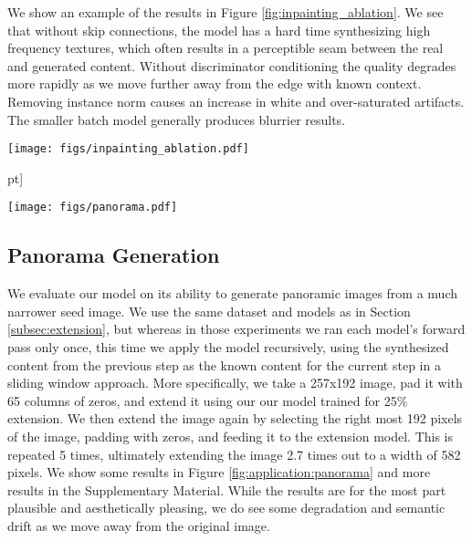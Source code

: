 We show an example of the results in Figure \ref{fig:inpainting_ablation}. We see that without skip connections, the model has a hard time synthesizing high frequency textures, which often results in a perceptible seam between the real and generated content. Without discriminator conditioning the quality degrades more rapidly as we move further away from the edge with known context. Removing instance norm causes an increase in white and over-saturated artifacts. The smaller batch model generally produces blurrier results.

\begin{figure*}
\newcommand{\figurewidth}{\textwidth}
\small
    \centering
    \begin{minipage}{\textwidth}
	    \centering
        \texttt{[image: figs/inpainting\_ablation.pdf]}
        \caption{Further analysis: (a) Comparing the different models on inpainting tasks; our conditioned model performs on par with the state of the art models such as PConv and DeepFill for the inpainting problem. (b) Ablation tests: we remove (from second column to fifth column) only one of the following: discriminator conditioning, instance norm, skip connections, and reduce batch size.}    
        \label{fig:inpainting_ablation}
    \end{minipage}\5pt]
 
    \begin{minipage}{\textwidth}
    	\centering
        \texttt{[image: figs/panorama.pdf]}
        \caption{Our models can also be used generate image panoramas. This can be viewed as a stress test for image extension tasks. We recursively apply the 25\% model to create a very large output image of about 3 times the original width.}
        \label{fig:application:panorama}
    \end{minipage}    
\end{figure*}

\subsection{Panorama Generation}
\label{subsec:panorama}

We evaluate our model on its ability to generate panoramic images from a much narrower seed image. We use the same dataset and models as in Section \ref{subsec:extension}, but whereas in those experiments we ran each model's forward pass only once, this time we apply the model recursively, using the synthesized content from the previous step as the known content for the current step in a sliding window approach. More specifically, we take a 257x192 image, pad it with 65 columns of zeros, and extend it using our our model trained for 25\% extension. We then extend the image again by selecting the right most 192 pixels of the image, padding with zeros, and feeding it to the extension model. This is repeated 5 times, ultimately extending the image 2.7 times out to a width of 582 pixels. We show some results in Figure \ref{fig:application:panorama} and more results in the Supplementary Material. While the results are for the most part plausible and aesthetically pleasing, we do see some degradation and semantic drift as we move away from the original image. 


